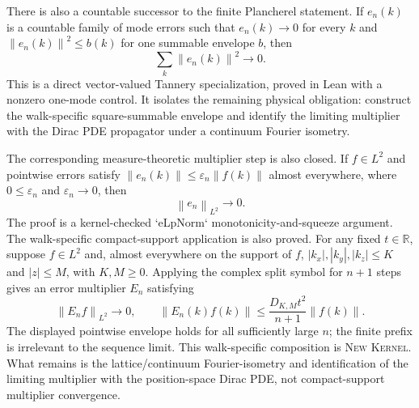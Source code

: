 \documentclass[11pt]{article}
\newcommand{\Kernel}{\textcolor{kernelcolor}{\textsc{Kernel}}}
\newcommand{\NewResult}{\textsc{New}}
\newcommand{\norm}[1]{\left\lVert #1\right\rVert}
\begin{document}
  There is also a countable successor to the finite Plancherel statement.  If
  $e_n(k)$ is a countable family of mode errors such that
  $e_n(k)\to0$ for every $k$ and
  $\norm{e_n(k)}^2\leq b(k)$ for one summable envelope $b$, then
  \begin{equation}\label{eq:countablel2}
    \sum_k \norm{e_n(k)}^2\longrightarrow0.
  \end{equation}
  This is a direct vector-valued Tannery specialization, proved in Lean with a
  nonzero one-mode control.  It isolates the remaining physical obligation:
  construct the walk-specific square-summable envelope and identify the
  limiting multiplier with the Dirac PDE propagator under a continuum Fourier
  isometry.

  The corresponding measure-theoretic multiplier step is also closed.  If
  $f\in L^2$ and pointwise errors satisfy
  $\norm{e_n(k)}\leq\varepsilon_n\norm{f(k)}$ almost everywhere, where
  $0\leq\varepsilon_n$ and $\varepsilon_n\to0$, then
  \begin{equation}\label{eq:continuousl2multiplier}
    \norm{e_n}_{L^2}\longrightarrow0.
  \end{equation}
  The proof is a kernel-checked `eLpNorm` monotonicity-and-squeeze argument.
  The walk-specific compact-support application is also proved.  For any
  fixed $t\in\mathbb R$, suppose $f\in L^2$ and, almost everywhere on the support of $f$,
  $|k_x|,|k_y|,|k_z|\leq K$ and $|z|\leq M$, with $K,M\geq0$.  Applying the
  complex split symbol for $n+1$ steps gives an error multiplier $E_n$ satisfying
  \begin{equation}\label{eq:walkcompactl2}
    \norm{E_nf}_{L^2}\longrightarrow0,
    \qquad
    \norm{E_n(k)f(k)}
      \leq\frac{D_{K,M}t^2}{n+1}\norm{f(k)}.
  \end{equation}
  The displayed pointwise envelope holds for all sufficiently large $n$; the
  finite prefix is irrelevant to the sequence limit.
  This walk-specific composition is \NewResult{} \Kernel{}.  What remains is
  the lattice/continuum Fourier-isometry and identification of the limiting
  multiplier with the position-space Dirac PDE, not compact-support multiplier
  convergence.
\end{document}
